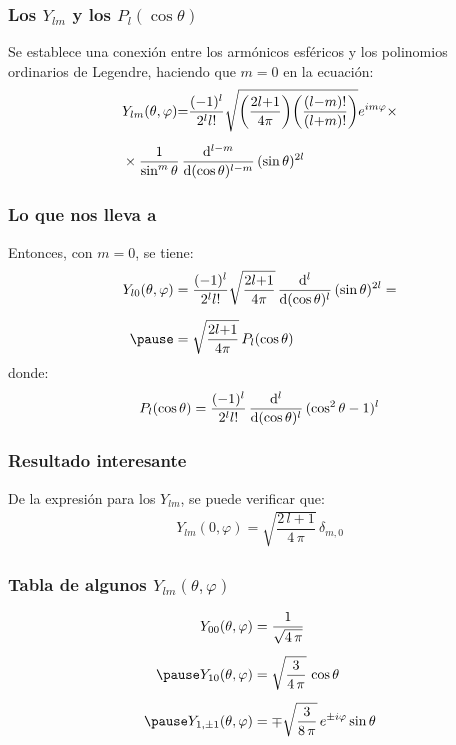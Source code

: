 \documentclass[12pt]{beamer}
\begin{document}
\begin{frame}
\frametitle{Los $Y_{lm}$ y los $P_{l}(\cos \theta)$}
Se establece una conexión entre los armónicos esféricos y los polinomios ordinarios de Legendre, haciendo que $m = 0$ en la ecuación:
\pause
\begin{align*}
&Y_{lm}(\theta, \varphi) {=} \dfrac{(-1)^{l}}{2^{l} l!} \sqrt{\bigg( \dfrac{ 2 l {+} 1}{4 \pi} \bigg)\bigg( \dfrac{(l {-} m)!}{(l {+} m)!} \bigg)} e^{i m \varphi} \times \\[0.5em]
&\times \dfrac{1}{\sin^{m} \theta} \, \dv[l-m]{(\cos \theta)} \, (\sin \theta)^{2l}
\end{align*}
\end{frame}
\begin{frame}
\frametitle{Lo que nos lleva a}
Entonces, con $m = 0$, se tiene:
\pause
\begin{eqnarray*}
\begin{aligned}
Y_{l0}(\theta, \varphi) &= \dfrac{(-1)^{l}}{2^{l} l!} \sqrt{ \dfrac{ 2 l {+} 1}{4 \pi}} \, \dv[l]{(\cos \theta)} \, (\sin \theta)^{2l} = \\[0.5em] \pause
&= \sqrt{ \dfrac{ 2 l {+} 1}{4 \pi}} \, P_{l} (\cos \theta)
\end{aligned}
\end{eqnarray*}
\pause
donde:
\pause
\begin{align*}
P_{l} (\cos \theta) = \dfrac{(-1)^{l}}{2^{l} l!} \, \dv[l]{(\cos \theta)} \, (\cos^{2} \theta - 1)^{l}
\end{align*}
\end{frame}
\begin{frame}
\frametitle{Resultado interesante}
De la expresión para los $Y_{lm}$, se puede verificar que:
\pause
\begin{align*}
Y_{lm} (0, \varphi) = \sqrt{\dfrac{2 \, l + 1}{4 \, \pi}} \, \delta_{m, 0}
\end{align*}
\end{frame}
\begin{frame}
\frametitle{Tabla de algunos $Y_{lm}(\theta, \varphi)$}
\begin{eqnarray*}
\begin{aligned}
Y_{00} (\theta, \varphi) &= \dfrac{1}{\sqrt{4 \, \pi}} \\[0.5em] \pause
Y_{10} (\theta, \varphi) &= \sqrt{\dfrac{3}{4 \, \pi}} \, \cos \theta \\[0.5em] \pause
Y_{1, \pm 1} (\theta, \varphi) &= \mp \sqrt{\dfrac{3}{8 \, \pi}} \, e^{\pm i \varphi} \sin \theta
\end{aligned}
\end{eqnarray*}
\end{frame}    
\end{document}
